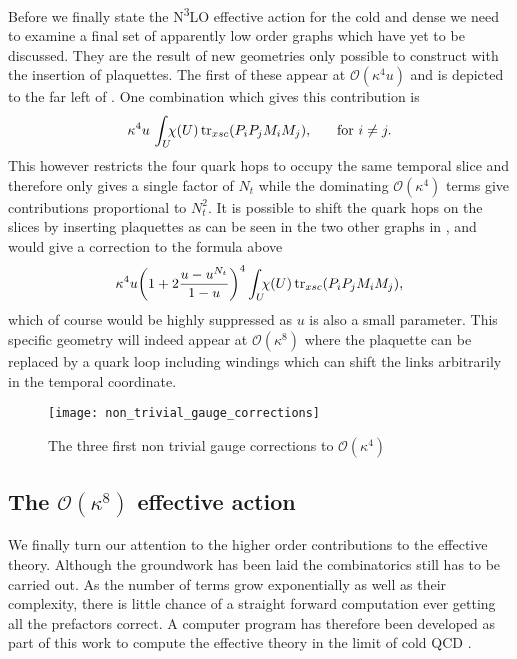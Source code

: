 Before we finally state the N\textsuperscript{3}LO effective action for the cold
and dense we need to examine a final set of apparently low order graphs which
have yet to be discussed. They are the result of new geometries only possible to
construct with the insertion of plaquettes. The first of these appear at
$\mathcal{O}(\kappa^4 u)$ and is depicted to the far left of
. One combination which gives this contribution is
%
\begin{equation}
  \kappa^4 u\, \int_{\mathrlap{U}\:} \chi(U) \tr_{xsc} (P_i P_j M_i M_j), \hskip.5cm \text{ for } i \neq j.
\end{equation}
%
This however restricts the four quark hops to occupy the same temporal slice and
therefore only gives a single factor of $N_t$ while the dominating
$\mathcal{O}(\kappa^4)$ terms give contributions proportional to $N_t^2$. It is
possible to shift the quark hops on the slices by inserting plaquettes as can be
seen in the two other graphs in , and would give a
correction to the formula above
%
\begin{equation}
  \kappa^4 u \bigg(1 + 2 \frac{u - u^{N_t}}{1-u} \bigg)^4
    \int_{\mathrlap{U}\:} \chi(U) \tr_{xsc} (P_i P_j M_i M_j),
\end{equation}
%
which of course would be highly suppressed as $u$ is also a small parameter.
This specific geometry will indeed appear at $\mathcal{O}(\kappa^8)$ where the
plaquette can be replaced by a quark loop including windings which can shift the
links arbitrarily in the temporal coordinate.

\begin{figure}
  {\centering
    \texttt{[image: non\_trivial\_gauge\_corrections]}\par}
  \caption{The three first non trivial gauge corrections to
    $\mathcal{O}(\kappa^4)$}
  \label{fig-nontrivial-gauge}
\end{figure}

\subsection{The \texorpdfstring{$\mathcal{O}(\kappa^8)$}{O(k8)} effective action}

We finally turn our attention to the higher order contributions to the effective
theory. Although the groundwork has been laid the combinatorics still has to be
carried out. As the number of terms grow exponentially as well as their
complexity, there is little chance of a straight forward computation ever
getting all the prefactors correct. A computer program has therefore been
developed as part of this work to compute the effective theory in the limit of
cold QCD \citep{jonas_rylund_glesaaen_2016_56319}.

